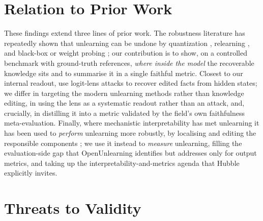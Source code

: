\section{Relation to Prior Work}
\label{sec:d-related}

These findings extend three lines of prior work. The robustness literature has repeatedly shown that
unlearning can be undone by quantization \citep{zhang2024quantization}, relearning
\citep{lynch2024eight,fan2025relearn}, and black-box or weight probing \citep{thaker2024blackbox,
deeb2024weights}; our contribution is to show, on a controlled benchmark with ground-truth references,
\emph{where inside the model} the recoverable knowledge sits and to summarise it in a single faithful
metric. Closest to our internal readout, \citet{patil2023candelete} use logit-lens attacks to recover
edited facts from hidden states; we differ in targeting the modern unlearning methods rather than knowledge
editing, in using the lens as a systematic readout rather than an attack, and, crucially, in distilling it
into a metric validated by the field's own faithfulness meta-evaluation. Finally, where mechanistic
interpretability has met unlearning it has been used to \emph{perform} unlearning more robustly, by
localising and editing the responsible components \citep{guo2024mechanistic,sae2025clamping}; we use it
instead to \emph{measure} unlearning, filling the evaluation-side gap that OpenUnlearning
\citep{dorna2025openunlearning} identifies but addresses only for output metrics, and taking up the
interpretability-and-metrics agenda that Hubble \citep{allegro2025hubble} explicitly invites.

\section{Threats to Validity}
\label{sec:d-threats}

